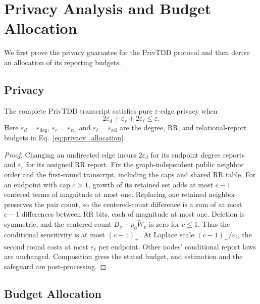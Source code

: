 \section{Privacy Analysis and Budget Allocation}
\label{sec:analysis}
We first prove the privacy guarantee for the PrivTDD protocol and then derive an allocation of its reporting budgets.

\subsection{Privacy}
\begin{theorem}\label{thm:pg-private}
The complete PrivTDD transcript satisfies pure $\varepsilon$-edge privacy when
\[
  2\varepsilon_d+\varepsilon_r+2\varepsilon_\ell\leq\varepsilon.
\]
Here $\varepsilon_d=\varepsilon_{\mathrm{deg}}$, $\varepsilon_r=\varepsilon_{\mathrm{rr}}$, and $\varepsilon_\ell=\varepsilon_{\mathrm{rel}}$ are the degree, RR, and relational-report budgets in Eq.~\eqref{eq:privacy_allocation}.
\end{theorem}

\begin{proof}
Changing an undirected edge incurs $2\varepsilon_d$ for its endpoint degree reports and $\varepsilon_r$ for its assigned RR report.
Fix the graph-independent public neighbor order and the first-round transcript, including the caps and shared RR table.
For an endpoint with cap $c>1$, growth of its retained set adds at most $c-1$ centered terms of magnitude at most one.
Replacing one retained neighbor preserves the pair count, so the centered-count difference is a sum of at most $c-1$ differences between RR bits, each of magnitude at most one.
Deletion is symmetric, and the centered count $B_v-p_0\widetilde{W}_v$ is zero for $c\leq1$.
Thus the conditional sensitivity is at most $(c-1)_+$.
At Laplace scale $(c-1)_+/\varepsilon_\ell$, the second round costs at most $\varepsilon_\ell$ per endpoint.
Other nodes' conditional report laws are unchanged.
Composition gives the stated budget, and estimation and the safeguard are post-processing.
\end{proof}

\subsection{Budget Allocation}
\label{sec:analysis:allocation}
\label{sec:analysis:utility}

